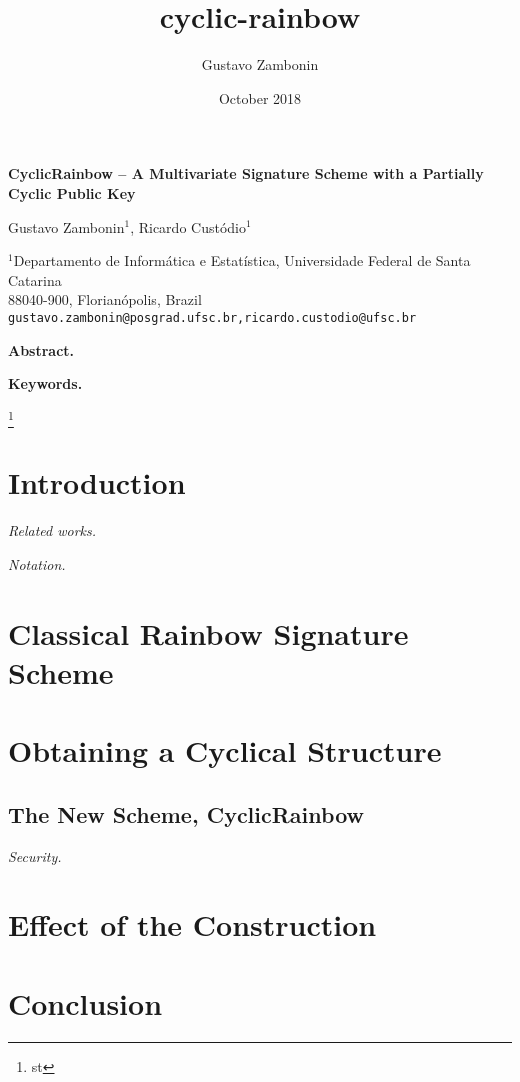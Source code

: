 \documentclass[a4paper,14pt]{extarticle}
\title{cyclic-rainbow}
\author{Gustavo Zambonin}
\date{October 2018}
\begin{document}
\begin{center}
    {\Large\bf CyclicRainbow -- A Multivariate Signature 
    Scheme with a Partially Cyclic Public Key} \vspace{.75cm}
    
    Gustavo Zambonin$^{1}$, Ricardo Custódio$^{1}$
    
    $^{1}$Departamento de Informática e Estatística, Universidade Federal de Santa Catarina \\
    88040-900, Florianópolis, Brazil \\
    \texttt{gustavo.zambonin@posgrad.ufsc.br,ricardo.custodio@ufsc.br} \vspace{.75cm}
    
    \textbf{Abstract.} 
    
    \textbf{Keywords.}
\end{center}

\footnote{st}

\section{Introduction}

\emph{Related works.}

\emph{Notation.}

\section{Classical Rainbow Signature Scheme}

\section{Obtaining a Cyclical Structure}

\subsection{The New Scheme, CyclicRainbow}

\emph{Security.}

\section{Effect of the Construction}

\section{Conclusion}
\end{document}
